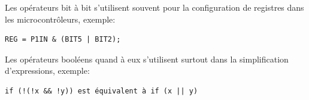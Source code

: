 Les opérateurs bit à bit s'utilisent souvent pour la configuration de registres dans les microcontrôleurs, exemple:

\lstset{style=customc}
\begin{lstlisting}
REG = P1IN & (BIT5 | BIT2);
\end{lstlisting}

Les opérateurs booléens quand à eux s'utilisent surtout dans la simplification d'expressions, exemple:

\lstset{style=customc}
\begin{lstlisting}
if (!(!x && !y)) est équivalent à if (x || y)
\end{lstlisting}

%
%
%
